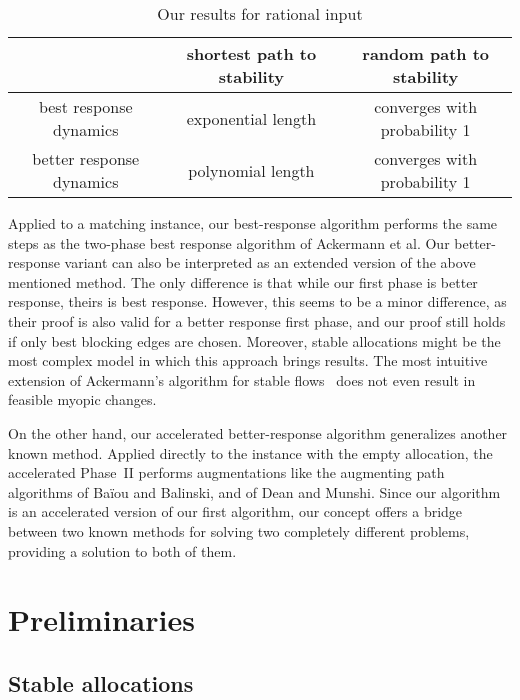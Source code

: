 \documentclass{llncs}
\begin{document}
\begin{table}[h]
	\centering
		\begin{tabular}{|c|c c|}
		\hline
			\phantom{n}& shortest path to stability & random path to stability\\ \hline
			best response dynamics & exponential length & converges with probability 1\\
			better response dynamics & polynomial length & converges with probability 1\\
		\hline
		\end{tabular}
\caption{Our results for rational input}
\end{table}

Applied to a matching instance, our best-response algorithm performs the same steps as the two-phase best response algorithm of Ackermann et al. Our better-response variant can also be interpreted as an extended version of the above mentioned method. The only difference is that while our first phase is better response, theirs is best response. However, this seems to be a minor difference, as their proof is also valid for a better response first phase, and our proof still holds if only best blocking edges are chosen. Moreover, stable allocations might be the most complex model in which this approach brings results. The most intuitive extension of Ackermann's algorithm for stable flows~\cite{egres-09-11} does not even result in feasible myopic changes. 

On the other hand, our accelerated better-response algorithm generalizes another known method. Applied directly to the instance with the empty allocation, the accelerated Phase~II performs augmentations like the augmenting path algorithms of Ba\"iou and Balinski, and of Dean and Munshi. Since our algorithm is an accelerated version of our first algorithm, our concept offers a bridge between two known methods for solving two completely different problems, providing a solution to both of them.

\section{Preliminaries}
\label{sec_pre}

\subsection{Stable allocations}
\end{document}

